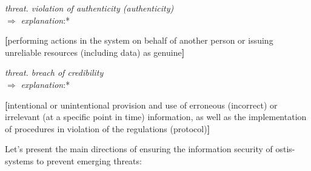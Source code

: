 \documentclass{article}
\begin{document}
\begin{multicols}{2}
\begin{description}[leftmargin=!, labelwidth=1cm, itemsep=-1.5mm]
\item[$\supset$] \vspace{-0.1cm} \textit {threat. violation of authenticity (authenticity)} \\
\vspace{0.1cm} \hspace{-0.23cm}  $\Rightarrow$  \hspace{0.5cm} \textit{explanation}:* 
\begin{description}[leftmargin=!, labelwidth=0.9cm, itemsep=-1.5mm]
   \item \vspace{-0.4cm}\textbf{[}performing actions in the system on behalf
of another person or issuing unreliable
resources (including data) as genuine\textbf{]}
\end{description}

\item[$\supset$] \vspace{-0.1cm} \textit {threat. breach of credibility
} \\
\vspace{0.1cm} \hspace{-0.23cm}  $\Rightarrow$  \hspace{0.5cm} \textit{explanation}:*
\begin{description}[leftmargin=!, labelwidth=0.9cm, itemsep=-1.5mm]
   \item \vspace{-0.4cm}\textbf{[}intentional or unintentional provision and
use of erroneous (incorrect) or irrelevant
(at a specific point in time) information, as
well as the implementation of procedures
in violation of the regulations (protocol)\textbf{]}
\end{description}
\end{description}

\par 
\vspace{-0.1cm} Let’s present the main directions of ensuring the
information security of ostis-systems to prevent emerging
threats:


\end{multicols}
\end{document}
